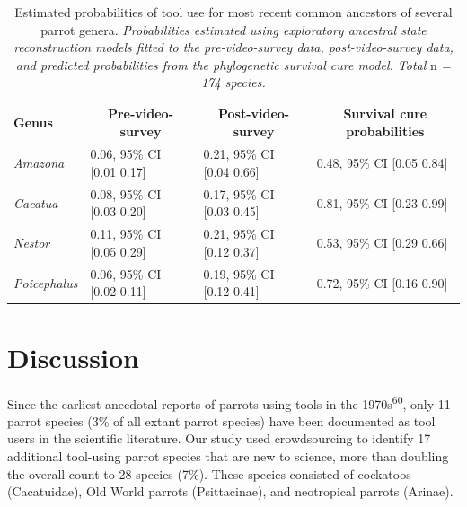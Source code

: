\documentclass[
  man,floatsintext]{apa6}
\begin{document}
\begin{table}[tbp]

\begin{center}
\begin{threeparttable}

\caption{\label{tab:tableASR}Estimated probabilities of tool use for most recent common ancestors of several parrot genera. \emph{Probabilities estimated using exploratory ancestral state reconstruction models fitted to the pre-video-survey data, post-video-survey data, and predicted probabilities from the phylogenetic survival cure model. Total} n \emph{= 174 species.}}

\begin{tabular}{llll}
\toprule
Genus & \multicolumn{1}{c}{Pre-video-survey} & \multicolumn{1}{c}{Post-video-survey} & \multicolumn{1}{c}{Survival cure probabilities}\\
\midrule
\textit{Amazona} & 0.06, 95\% CI [0.01 0.17] & 0.21, 95\% CI [0.04 0.66] & 0.48, 95\% CI [0.05 0.84]\\
\textit{Cacatua} & 0.08, 95\% CI [0.03 0.20] & 0.17, 95\% CI [0.03 0.45] & 0.81, 95\% CI [0.23 0.99]\\
\textit{Nestor} & 0.11, 95\% CI [0.05 0.29] & 0.21, 95\% CI [0.12 0.37] & 0.53, 95\% CI [0.29 0.66]\\
\textit{Poicephalus} & 0.06, 95\% CI [0.02 0.11] & 0.19, 95\% CI [0.12 0.41] & 0.72, 95\% CI [0.16 0.90]\\
\bottomrule
\end{tabular}

\end{threeparttable}
\end{center}

\end{table}

\hypertarget{discussion}{%
\section{Discussion}\label{discussion}}

Since the earliest anecdotal reports of parrots using tools in the 1970s\textsuperscript{60}, only 11 parrot species (3\% of all extant parrot species) have been documented as tool users in the scientific literature. Our study used crowdsourcing to identify 17 additional tool-using parrot species that are new to science, more than doubling the overall count to 28 species (7\%). These species consisted of cockatoos (Cacatuidae), Old World parrots (Psittacinae), and neotropical parrots (Arinae).
\end{document}
